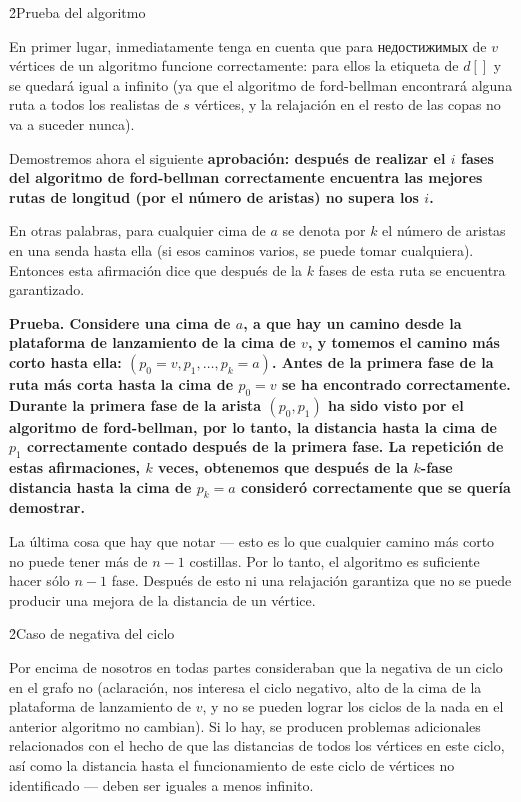 \h2{Prueba del algoritmo}

En primer lugar, inmediatamente tenga en cuenta que para недостижимых de $v$ vértices de un algoritmo funcione correctamente: para ellos la etiqueta de $d[]$ y se quedará igual a infinito (ya que el algoritmo de ford-bellman encontrará alguna ruta a todos los realistas de $s$ vértices, y la relajación en el resto de las copas no va a suceder nunca).

Demostremos ahora el siguiente \bf{aprobación}: después de realizar el $i$ fases del algoritmo de ford-bellman correctamente encuentra las mejores rutas de longitud (por el número de aristas) no supera los $i$.

En otras palabras, para cualquier cima de $a$ se denota por $k$ el número de aristas en una senda hasta ella (si esos caminos varios, se puede tomar cualquiera). Entonces esta afirmación dice que después de la $k$ fases de esta ruta se encuentra garantizado. 

\bf{Prueba}. Considere una cima de $a$, a que hay un camino desde la plataforma de lanzamiento de la cima de $v$, y tomemos el camino más corto hasta ella: $(p_0=v, p_1, \ldots, p_k=a)$. Antes de la primera fase de la ruta más corta hasta la cima de $p_0=v$ se ha encontrado correctamente. Durante la primera fase de la arista $(p_0,p_1)$ ha sido visto por el algoritmo de ford-bellman, por lo tanto, la distancia hasta la cima de $p_1$ correctamente contado después de la primera fase. La repetición de estas afirmaciones, $k$ veces, obtenemos que después de la $k$-fase distancia hasta la cima de $p_k=a$ consideró correctamente que se quería demostrar.

La última cosa que hay que notar --- esto es lo que cualquier camino más corto no puede tener más de $n-1$ costillas. Por lo tanto, el algoritmo es suficiente hacer sólo $n-1$ fase. Después de esto ni una relajación garantiza que no se puede producir una mejora de la distancia de un vértice.


\h2{Caso de negativa del ciclo}

Por encima de nosotros en todas partes consideraban que la negativa de un ciclo en el grafo no (aclaración, nos interesa el ciclo negativo, alto de la cima de la plataforma de lanzamiento de $v$, y no se pueden lograr los ciclos de la nada en el anterior algoritmo no cambian). Si lo hay, se producen problemas adicionales relacionados con el hecho de que las distancias de todos los vértices en este ciclo, así como la distancia hasta el funcionamiento de este ciclo de vértices no identificado --- deben ser iguales a menos infinito.

